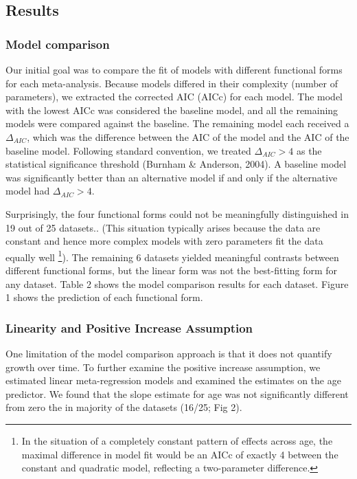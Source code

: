 \documentclass[
  man]{apa6}
\begin{document}
\hypertarget{results}{%
\subsection{Results}\label{results}}

\hypertarget{model-comparison}{%
\subsubsection{Model comparison}\label{model-comparison}}

Our initial goal was to compare the fit of models with different functional forms for each meta-analysis. Because models differed in their complexity (number of parameters), we extracted the corrected AIC (AICc) for each model. The model with the lowest AICc was considered the baseline model, and all the remaining models were compared against the baseline. The remaining model each received a \(\Delta_{AIC}\), which was the difference between the AIC of the model and the AIC of the baseline model. Following standard convention, we treated \(\Delta_{AIC} > 4\) as the statistical significance threshold (Burnham \& Anderson, 2004). A baseline model was significantly better than an alternative model if and only if the alternative model had \(\Delta_{AIC} > 4\).

Surprisingly, the four functional forms could not be meaningfully distinguished in 19 out of 25 datasets.. (This situation typically arises because the data are constant and hence more complex models with zero parameters fit the data equally well \footnote{In the situation of a completely constant pattern of effects across age, the maximal difference in model fit would be an AICc of exactly 4 between the constant and quadratic model, reflecting a two-parameter difference.}). The remaining 6 datasets yielded meaningful contrasts between different functional forms, but the linear form was not the best-fitting form for any dataset. Table 2 shows the model comparison results for each dataset. Figure 1 shows the prediction of each functional form.

\hypertarget{linearity-and-positive-increase-assumption}{%
\subsubsection{Linearity and Positive Increase Assumption}\label{linearity-and-positive-increase-assumption}}

One limitation of the model comparison approach is that it does not quantify growth over time. To further examine the positive increase assumption, we estimated linear meta-regression models and examined the estimates on the age predictor. We found that the slope estimate for age was not significantly different from zero the in majority of the datasets (16/25; Fig 2).
\end{document}
